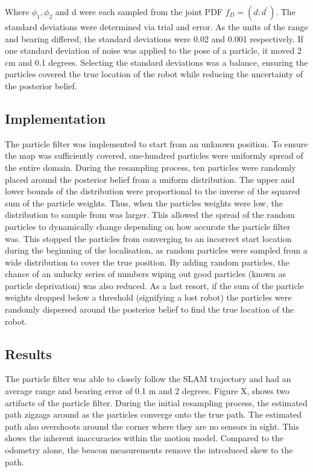 \documentclass[a4paper,12pt]{article}
\begin{document}
Where $\phi_{1},\phi_{2}$ and d were each sampled from the joint PDF $f_{D}=(d;d^{'})$. The standard deviations were determined via trial and error. As the units of the range and bearing differed, the standard deviations were 0.02 and 0.001 respectively. If one standard deviation of noise was applied to the pose of a particle, it moved 2 cm and 0.1 degrees. Selecting the standard deviations was a balance, ensuring the particles covered the true location of the robot while reducing the uncertainty of the posterior belief. 


\subsection{Implementation}

The particle filter was implemented to start from an unknown position. To ensure the map was sufficiently covered, one-hundred particles were uniformly spread of the entire domain. During the resampling process, ten particles were randomly placed around the posterior belief from a uniform distribution. The upper and lower bounds of the distribution were proportional to the inverse of the squared sum of the particle weights. Thus, when the particles weights were low, the distribution to sample from was larger. This allowed the spread of the random particles to dynamically change depending on how accurate the particle filter was. This stopped the particles from converging to an incorrect start location during the beginning of the localisation, as random particles were sampled from a wide distribution to cover the true position. By adding random particles, the chance of an unlucky series of numbers wiping out good particles (known as particle deprivation) was also reduced. As a last resort, if the sum of the particle weights dropped below a threshold (signifying a lost robot) the particles were randomly dispersed around the posterior belief to find the true location of the robot. 

\subsection{Results}

The particle filter was able to closely follow the SLAM trajectory and had an average range and bearing error of 0.1 m and 2 degrees. Figure X, shows two artifacts of the particle filter. During the initial resampling process, the estimated path zigzags around as the particles converge onto the true path. The estimated path also overshoots around the corner where they are no sensors in sight. This shows the inherent inaccuracies within the motion model. Compared to the odometry alone, the beacon measurements remove the introduced skew to the path. 
\end{document}
